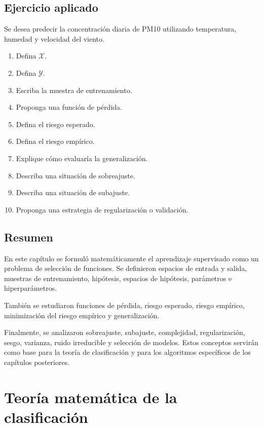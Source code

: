 \documentclass[
  spanish,
  11pt,
  letterpaper,
  DIV=11,
  numbers=noendperiod]{scrreprt}
\providecommand{\tightlist}{%
  \setlength{\itemsep}{0pt}\setlength{\parskip}{0pt}}
\theoremstyle{definition}
\theoremstyle{plain}
\theoremstyle{definition}
\theoremstyle{remark}
\begin{document}
\section{Ejercicio aplicado}\label{ejercicio-aplicado-2}

Se desea predecir la concentración diaria de PM10 utilizando
temperatura, humedad y velocidad del viento.

\begin{enumerate}
\def\labelenumi{\arabic{enumi}.}
\tightlist
\item
  Defina \(\mathcal{X}\).
\item
  Defina \(\mathcal{Y}\).
\item
  Escriba la muestra de entrenamiento.
\item
  Proponga una función de pérdida.
\item
  Defina el riesgo esperado.
\item
  Defina el riesgo empírico.
\item
  Explique cómo evaluaría la generalización.
\item
  Describa una situación de sobreajuste.
\item
  Describa una situación de subajuste.
\item
  Proponga una estrategia de regularización o validación.
\end{enumerate}

\section{Resumen}\label{resumen-4}

En este capítulo se formuló matemáticamente el aprendizaje supervisado
como un problema de selección de funciones. Se definieron espacios de
entrada y salida, muestras de entrenamiento, hipótesis, espacios de
hipótesis, parámetros e hiperparámetros.

También se estudiaron funciones de pérdida, riesgo esperado, riesgo
empírico, minimización del riesgo empírico y generalización.

Finalmente, se analizaron sobreajuste, subajuste, complejidad,
regularización, sesgo, varianza, ruido irreducible y selección de
modelos. Estos conceptos servirán como base para la teoría de
clasificación y para los algoritmos específicos de los capítulos
posteriores.

\chapter{Teoría matemática de la
clasificación}\label{sec-teoria-clasificacion}
\end{document}
